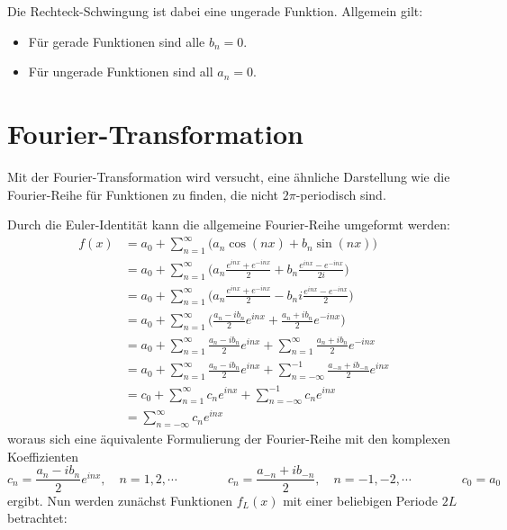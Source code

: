 \documentclass[a4paper, 11pt, accentcolor = tud3b]{tudreport}
\begin{document}
				Die Rechteck-Schwingung ist dabei eine ungerade Funktion. Allgemein gilt:
				\begin{itemize}
					\item Für gerade Funktionen sind alle \( b_n = 0 \).
					\item Für ungerade Funktionen sind all \( a_n = 0 \).
				\end{itemize}

		\section{Fourier-Transformation}
			Mit der Fourier-Transformation wird versucht, eine ähnliche Darstellung wie die Fourier-Reihe für Funktionen zu finden, die nicht \(2\pi\)-periodisch sind.
			
			Durch die Euler-Identität kann die allgemeine Fourier-Reihe umgeformt werden:
			\begin{align*}
				f(x)
					&= a_0 + \sum_{n = 1}^{\infty} \big( a_n \cos(nx) + b_n \sin(nx) \big) \\
					&= a_0 + \sum_{n = 1}^{\infty} \Bigg( a_n \frac{e^{inx} + e^{-inx}}{2} + b_n \frac{e^{inx} - e^{-inx}}{2i} \Bigg) \\
					&= a_0 + \sum_{n = 1}^{\infty} \Bigg( a_n \frac{e^{inx} + e^{-inx}}{2} - b_n i \frac{e^{inx} - e^{-inx}}{2} \Bigg) \\
					&= a_0 + \sum_{n = 1}^{\infty} \Bigg( \frac{a_n - ib_n}{2} e^{inx} + \frac{a_n + ib_n}{2} e^{-inx} \Bigg) \\
					&= a_0 + \sum_{n = 1}^{\infty} \frac{a_n - ib_n}{2} e^{inx} + \sum_{n = 1}^{\infty} \frac{a_n + ib_n}{2} e^{-inx} \\
					&= a_0 + \sum_{n = 1}^{\infty} \frac{a_n - ib_n}{2} e^{inx} + \sum_{n = -\infty}^{-1} \frac{a_{-n} + ib_{-n}}{2} e^{inx} \\
					&= c_0 + \sum_{n = 1}^{\infty} c_n e^{inx} + \sum_{n = -\infty}^{-1} c_n e^{inx} \\
					&= \sum_{n = -\infty}^{\infty} c_n e^{inx}
			\end{align*}
			woraus sich eine äquivalente Formulierung der Fourier-Reihe mit den komplexen Koeffizienten
			\begin{equation*}
				c_n = \frac{a_n - ib_n}{2} e^{inx}, \quad n = 1, 2, \cdots \quad\quad\quad\quad c_n = \frac{a_{-n} + ib_{-n}}{2}, \quad n = -1, -2, \cdots \quad\quad\quad\quad c_0 = a_0
			\end{equation*}
			ergibt. Nun werden zunächst Funktionen \( f_L(x) \) mit einer beliebigen Periode \( 2L \) betrachtet:
\end{document}
